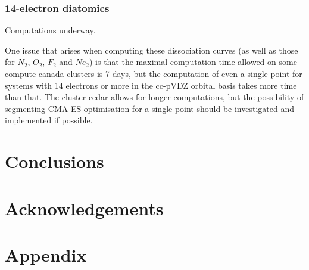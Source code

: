 \documentclass[twoside,twocolumn,9pt]{article}
\renewcommand{\refname}{Notes and references}
\begin{document}
\subsubsection{14-electron diatomics}
Computations underway.

One issue that arises when computing these dissociation curves (as well as those for $N_2$, $O_2$, $F_2$ and $Ne_2$) is that the maximal computation time allowed on some compute canada clusters is 7 days, but the computation of even a single point for systems with 14 electrons or more in the cc-pVDZ orbital basis takes more time than that. The cluster cedar allows for longer computations, but the possibility of segmenting CMA-ES optimisation for a single point should be investigated and implemented if possible. 

\section{Conclusions}

\section{Acknowledgements}

\section{Appendix}



\balance


\end{document}
